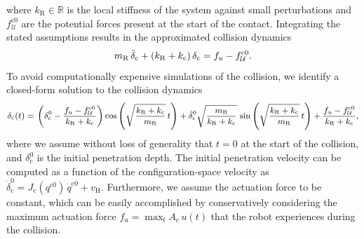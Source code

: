 where $k_\mathrm{R} \in \mathbb{R}$ is the local stiffness of the system against small perturbations and $f_{\mathcal{U}}^{\mathrm{c}0}$ are the potential forces present at the start of the contact.
Integrating the stated assumptions results in the approximated collision dynamics
\begin{equation}\label{eq:safetymetric:simplified_collision_dynamics}
    m_\mathrm{R} \, \Ddot{\delta}_\mathrm{c} + (k_\mathrm{R} + k_\mathrm{c}) \, \delta_\mathrm{c} = f_u - f_{\mathcal{U}}^{\mathrm{c}0}.
\end{equation}
To avoid computationally expensive simulations of the collision, we identify a closed-form solution to the collision dynamics
\begin{equation}\small\label{eq:safetymetric:collision_dynamics_cfs}
\begin{split}
    \delta_\mathrm{c}(t) =& \: \left (\delta_\mathrm{c}^0-\frac{f_u-f_{\mathcal{U}}^{\mathrm{c}0}}{k_\mathrm{R} + k_\mathrm{c}} \right ) \cos \left ( \sqrt{\frac{k_\mathrm{R} + k_\mathrm{c}}{m_\mathrm{R}}} \, t \right ) + \dot{\delta}_\mathrm{c}^0 \sqrt{\frac{m_\mathrm{R}}{k_\mathrm{R} + k_\mathrm{c}}} \, \sin \left ( \sqrt{\frac{k_\mathrm{R} + k_\mathrm{c}}{m_\mathrm{R}}} \, t \right ) + \frac{f_u-f_{\mathcal{U}}^{\mathrm{c}0}}{k_\mathrm{R} + k_\mathrm{c}},\\
\end{split}
\end{equation}
where we assume without loss of generality that $t=0$ at the start of the collision, and $\delta_\mathrm{c}^0$ is the initial penetration depth.
The initial penetration velocity can be computed as a function of the configuration-space velocity as $\dot{\delta}_\mathrm{c}^0 = J_\mathrm{c}(q^{\mathrm{c}0}) \, \dot{q}^{\mathrm{c}0} + v_\mathrm{H}$.
Furthermore, we assume the actuation force to be constant, which can be easily accomplished by conservatively considering the maximum actuation force $f_u = \max_t A_\mathrm{c} \, u(t)$ that the robot experiences during the collision.

